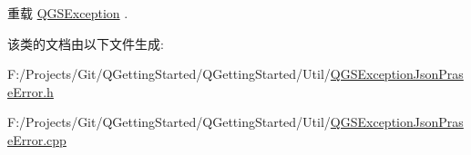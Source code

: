 重载 \mbox{\hyperlink{class_q_g_s_exception_a78e6d3c9f92bbc94440d4c2e946beed2}{Q\+G\+S\+Exception}} .



该类的文档由以下文件生成\+:\begin{DoxyCompactItemize}
\item 
F\+:/\+Projects/\+Git/\+Q\+Getting\+Started/\+Q\+Getting\+Started/\+Util/\mbox{\hyperlink{_q_g_s_exception_json_prase_error_8h}{Q\+G\+S\+Exception\+Json\+Prase\+Error.\+h}}\item 
F\+:/\+Projects/\+Git/\+Q\+Getting\+Started/\+Q\+Getting\+Started/\+Util/\mbox{\hyperlink{_q_g_s_exception_json_prase_error_8cpp}{Q\+G\+S\+Exception\+Json\+Prase\+Error.\+cpp}}\end{DoxyCompactItemize}
